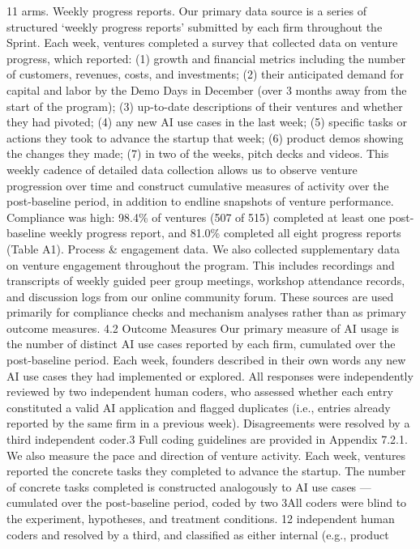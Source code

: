11
arms.
Weekly progress reports.
Our primary data source is a series of structured ‘weekly progress
reports’ submitted by each firm throughout the Sprint. Each week, ventures completed a survey
that collected data on venture progress, which reported: (1) growth and financial metrics including
the number of customers, revenues, costs, and investments; (2) their anticipated demand for capital
and labor by the Demo Days in December (over 3 months away from the start of the program); (3)
up-to-date descriptions of their ventures and whether they had pivoted; (4) any new AI use cases in
the last week; (5) specific tasks or actions they took to advance the startup that week; (6) product
demos showing the changes they made; (7) in two of the weeks, pitch decks and videos. This weekly
cadence of detailed data collection allows us to observe venture progression over time and construct
cumulative measures of activity over the post-baseline period, in addition to endline snapshots of
venture performance. Compliance was high: 98.4\% of ventures (507 of 515) completed at least one
post-baseline weekly progress report, and 81.0\% completed all eight progress reports (Table A1).
Process \& engagement data.
We also collected supplementary data on venture engagement
throughout the program. This includes recordings and transcripts of weekly guided peer group
meetings, workshop attendance records, and discussion logs from our online community forum.
These sources are used primarily for compliance checks and mechanism analyses rather than as
primary outcome measures.
4.2
Outcome Measures
Our primary measure of AI usage is the number of distinct AI use cases reported by each firm,
cumulated over the post-baseline period. Each week, founders described in their own words any new
AI use cases they had implemented or explored. All responses were independently reviewed by two
independent human coders, who assessed whether each entry constituted a valid AI application and
flagged duplicates (i.e., entries already reported by the same firm in a previous week). Disagreements
were resolved by a third independent coder.3 Full coding guidelines are provided in Appendix 7.2.1.
We also measure the pace and direction of venture activity. Each week, ventures reported the
concrete tasks they completed to advance the startup. The number of concrete tasks completed is
constructed analogously to AI use cases — cumulated over the post-baseline period, coded by two
3All coders were blind to the experiment, hypotheses, and treatment conditions.
12
independent human coders and resolved by a third, and classified as either internal (e.g., product
